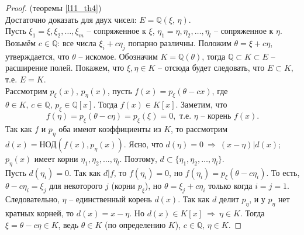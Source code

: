 \begin{proof} (теоремы \ref{l11_th4})\\
	Достаточно доказать для двух чисел: $E=\mathbb{Q}(\xi,\,\eta)$.\\
	Пусть $\xi_1 = \xi, \xi_2,\dots,\xi_m$ -- сопряженное к $\xi$, $\eta_1 = \eta, \eta_2,\dots,\eta_l$ -- сопряженное к $\eta$. 	Возьмём $c \in \mathbb{Q}$: все числа $\xi_i + c\eta_j$ попарно различны. Положим $\theta = \xi + c\eta$, утверждается, что $\theta$ -- искомое. Обозначим $K = \mathbb{Q}(\theta)$, тогда $\mathbb{Q} \subset K \subset E$ -- расширение полей. Покажем, что $\xi, \eta \in K$ -- отсюда будет следовать, что $E \subset K$, т.е. $E=K$.\\
	Рассмотрим $p_\xi(x),\,p_\eta(x)$, пусть $f(x) = p_\xi(\theta - cx)$, где $\theta \in K, \, c \in \mathbb{Q}, \, p_\xi \in \mathbb{Q}[x]$. Тогда $f(x) \in K[x]$. Заметим, что
	$$f(\eta) = p_\xi(\theta - c\eta) = p_\xi(\xi) =0, \text{ т.е. } \eta \text{ -- корень } f(x).$$
	Так как $f$ и $p_\eta$ оба имеют коэффициенты из $K$, то рассмотрим $d(x) = \text{НОД}(f(x), p_\eta(x))$. Ясно, что $d(\eta) = 0 \ \Rightarrow \ (x-\eta) \vert d(x)$; $p_\eta(x)$ имеет корни $\eta_1, \eta_2, \dots, \eta_l$. Поэтому, $d \subset \{ \eta_1, \eta_2, \dots, \eta_l \}$.\\
	Пусть $d(\eta_i)=0$. Так как $d \vert f$, то $f(\eta_i)=0$, но $f(\eta_i) = p_\xi(\theta - c\eta_i)$. То есть, $\theta - c\eta_i = \xi_j$ для некоторого $j$ (корни $p_\xi$), но $\theta = \xi_j + c\eta_i$ только когда $i=j=1$. Следовательно, $\eta$ -- единственный корень $d(x)$. Так как $d$ делит $p_\eta$, и у $p_\eta$ нет кратных корней, то $d(x) = x - \eta$. Но $d(x) \in K[x] \ \Rightarrow \ \eta \in K$. Тогда $\xi = \theta - c\eta \in K$, ведь $\theta \in K$ (по определению $K$), $c \in \mathbb{Q}, \, \eta \in K$.
\end{proof}

